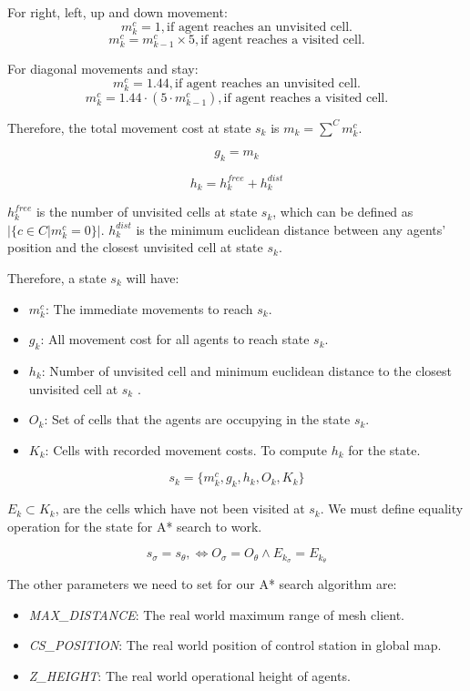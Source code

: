 For right, left, up and down movement:
$$ m_k^c = 1, \text{if agent reaches an unvisited cell.}$$
$$ m_k^c = m_{k-1}^c \times 5, \text{if agent reaches a visited cell.}$$

For diagonal movements and stay:
$$ m_k^c = 1.44, \text{if agent reaches an unvisited cell.} $$
$$ m_k^c = 1.44 \cdot (5 \cdot m_{k-1}^c), \text{if agent reaches a visited cell.}$$

Therefore, the total movement cost at state $s_k$ is $m_k = \sum\limits^C m_k^c$.

$$g_k = m_k $$

$$ h_k = h_k^{free} + h_k^{dist}$$

$h_k^{free}$ is the number of unvisited cells at state $s_k$, which can be defined as $|\{c \in C | m_k^c = 0\}|$. $h_k^{dist}$ is the minimum euclidean distance between any agents' position and the closest unvisited cell at state $s_k$.


Therefore, a state $s_k$ will have:
\begin{itemize}
	\item $m_k^c$: The immediate movements to reach $s_k$.
	\item $g_k$: All movement cost for all agents to reach state $s_k$.
	\item $h_k$: Number of unvisited cell and minimum euclidean distance to the closest unvisited cell at $s_k$ .
	\item $O_k$: Set of cells that the agents are occupying in the state $s_k$.
	\item $K_k$: Cells with recorded movement costs. To compute $h_k$ for the state.
\end{itemize}

$$ s_k = \{m_k^c, g_k, h_k, O_k, K_k\} $$

$E_k \subset K_k$, are the cells which have not been visited at $s_k$. We must define equality operation for the state for A* search to work.

$$ s_\sigma = s_\theta, \iff O_\sigma = O_\theta \land E_{k_{\sigma}} = E_{k_{\theta}} $$


The other parameters we need to set for our A* search algorithm are:
\begin{itemize}
	\item \textit{MAX\_DISTANCE}: The real world maximum range of mesh client. 
	\item \textit{CS\_POSITION}: The real world position of control station in global map.
	\item \textit{Z\_HEIGHT}: The real world operational height of agents.
\end{itemize}


